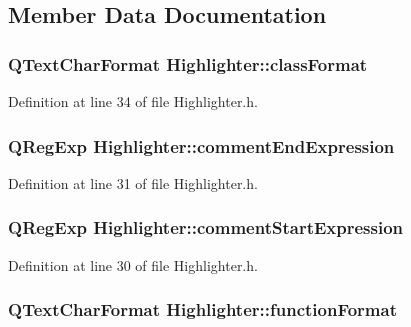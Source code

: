 \subsection{Member Data Documentation}
\hypertarget{class_highlighter_a765a13081aa25d818c766b7f8e50f454}{
\subsubsection[{class\-Format}]{\setlength{\rightskip}{0pt plus 5cm}Q\-Text\-Char\-Format Highlighter\-::class\-Format\hspace{0.3cm}{\ttfamily [private]}}}\label{class_highlighter_a765a13081aa25d818c766b7f8e50f454}


Definition at line 34 of file Highlighter.\-h.

\hypertarget{class_highlighter_a3baa1033bbdf70a16df42940968b72b4}{
\subsubsection[{comment\-End\-Expression}]{\setlength{\rightskip}{0pt plus 5cm}Q\-Reg\-Exp Highlighter\-::comment\-End\-Expression\hspace{0.3cm}{\ttfamily [private]}}}\label{class_highlighter_a3baa1033bbdf70a16df42940968b72b4}


Definition at line 31 of file Highlighter.\-h.

\hypertarget{class_highlighter_a67cdecd667929b4eefbc7057d58cd90b}{
\subsubsection[{comment\-Start\-Expression}]{\setlength{\rightskip}{0pt plus 5cm}Q\-Reg\-Exp Highlighter\-::comment\-Start\-Expression\hspace{0.3cm}{\ttfamily [private]}}}\label{class_highlighter_a67cdecd667929b4eefbc7057d58cd90b}


Definition at line 30 of file Highlighter.\-h.

\hypertarget{class_highlighter_a7e02cd8caee678c1256998c88d30e241}{
\subsubsection[{function\-Format}]{\setlength{\rightskip}{0pt plus 5cm}Q\-Text\-Char\-Format Highlighter\-::function\-Format\hspace{0.3cm}{\ttfamily [private]}}}\label{class_highlighter_a7e02cd8caee678c1256998c88d30e241}


